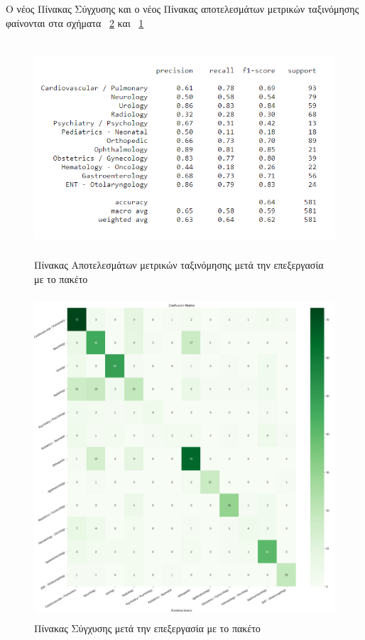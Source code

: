 Ο νέος Πίνακας Σύγχυσης και ο νέος Πίνακας αποτελεσμάτων μετρικών ταξινόμησης φαίνονται στα σχήματα ~\ref{figure5.7} και ~\ref{figure5.8}

\begin{figure} [ht!]
\centering
\includegraphics[width=\textwidth,height=8cm,keepaspectratio]{pictures/5.8results2.png} 
\caption{Πίνακας Αποτελεσμάτων μετρικών ταξινόμησης μετά την επεξεργασία με το πακέτο }\label{figure5.8}
\end{figure}

\begin{figure} [ht!]
\centering
\includegraphics[width=\textwidth,height=12cm,keepaspectratio]{pictures/5.7cMatrix2.png} 
\caption{Πίνακας Σύγχυσης  μετά την επεξεργασία με το πακέτο }\label{figure5.7}
\end{figure}
\clearpage

